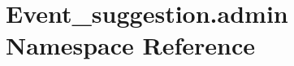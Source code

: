 \hypertarget{namespaceEvent__suggestion_1_1admin}{}\section{Event\+\_\+suggestion.\+admin Namespace Reference}
\label{namespaceEvent__suggestion_1_1admin}
